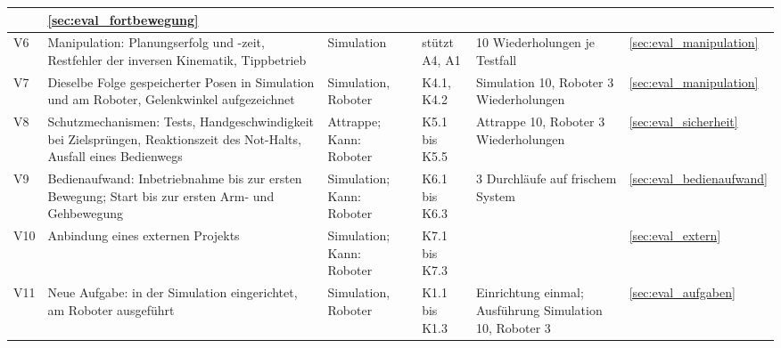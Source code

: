 \begin{table}[htbp]
\begin{tabularx}{\textwidth}{|P{1.4cm}|L|P{2.2cm}|P{1.9cm}|P{2.5cm}|P{1.5cm}|}
        & \ref{sec:eval_fortbewegung}\\\hline
        V6 & Manipulation: Planungserfolg und -zeit, Restfehler der inversen Kinematik, Tippbetrieb & Simulation & stützt A4, A1 & 10 Wiederholungen je Testfall %
        & \ref{sec:eval_manipulation}\\\hline
        V7 & Dieselbe Folge gespeicherter Posen in Simulation und am Roboter, Gelenkwinkel aufgezeichnet & Simulation, Roboter & K4.1, K4.2 & Simulation 10, Roboter 3 Wiederholungen %
        & \ref{sec:eval_manipulation}\\\hline
        V8 & Schutzmechanismen: Tests, Handgeschwindigkeit bei Zielsprüngen, Reaktionszeit des Not-Halts, Ausfall eines Bedienwegs & Attrappe; Kann: Roboter & K5.1 bis K5.5 & Attrappe 10, Roboter 3 Wiederholungen %
        & \ref{sec:eval_sicherheit}\\\hline
        V9 & Bedienaufwand: Inbetriebnahme bis zur ersten Bewegung; Start bis zur ersten Arm- und Gehbewegung & Simulation; Kann: Roboter & K6.1 bis K6.3 & 3 Durchläufe auf frischem System %
        & \ref{sec:eval_bedienaufwand}\\\hline
        V10 & Anbindung eines externen Projekts & Simulation; Kann: Roboter & K7.1 bis K7.3 &  & \ref{sec:eval_extern}\\\hline
        V11 & Neue Aufgabe: in der Simulation eingerichtet, am Roboter ausgeführt & Simulation, Roboter & K1.1 bis K1.3 & Einrichtung einmal; Ausführung Simulation 10, Roboter 3 %
        & \ref{sec:eval_aufgaben}\\\hline
    \end{tabularx}
\end{table}


